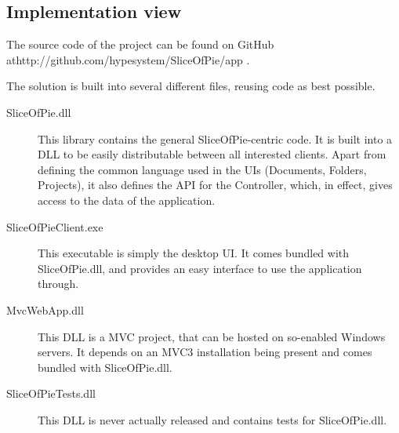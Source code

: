 \subsection{Implementation view}
\label{sec:implementationview}

The source code of the project can be found on GitHub at\newline http://github.com/hypesystem/SliceOfPie/app .

The solution is built into several different files, reusing code as best possible.

\begin{description}
    \item[SliceOfPie.dll] This library contains the general SliceOfPie-centric code. It is built into a
        DLL to be easily distributable between all interested clients. Apart from defining the common
        language used in the UIs (Documents, Folders, Projects), it also defines the API for the
        Controller, which, in effect, gives access to the data of the application.
    \item[SliceOfPieClient.exe] This executable is simply the desktop UI. It comes bundled with
        SliceOfPie.dll, and provides an easy interface to use the application through.
    \item[MvcWebApp.dll] This DLL is a MVC project, that can be hosted on so-enabled Windows servers.
        It depends on an MVC3 installation being present and comes bundled with SliceOfPie.dll.
    \item[SliceOfPieTests.dll] This DLL is never actually released and contains tests for SliceOfPie.dll.
\end{description}